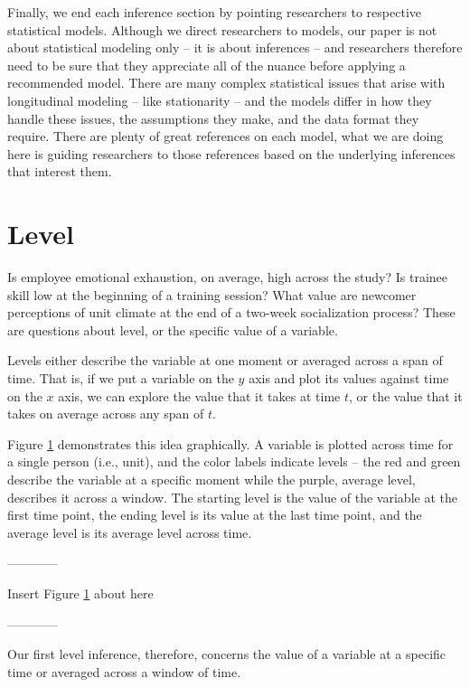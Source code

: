 \documentclass[english,,man]{apa6}
\theoremstyle{definition}
\theoremstyle{definition}
\theoremstyle{definition}
\theoremstyle{remark}
\begin{document}
Finally, we end each inference section by pointing researchers to
respective statistical models. Although we direct researchers to models,
our paper is not about statistical modeling only -- it is about
inferences -- and researchers therefore need to be sure that they
appreciate all of the nuance before applying a recommended model. There
are many complex statistical issues that arise with longitudinal
modeling -- like stationarity -- and the models differ in how they
handle these issues, the assumptions they make, and the data format they
require. There are plenty of great references on each model, what we are
doing here is guiding researchers to those references based on the
underlying inferences that interest them.

\hypertarget{level}{%
\section{Level}\label{level}}

Is employee emotional exhaustion, on average, high across the study? Is
trainee skill low at the beginning of a training session? What value are
newcomer perceptions of unit climate at the end of a two-week
socialization process? These are questions about level, or the specific
value of a variable.

Levels either describe the variable at one moment or averaged across a
span of time. That is, if we put a variable on the \(y\) axis and plot
its values against time on the \(x\) axis, we can explore the value that
it takes at time \(t\), or the value that it takes on average across any
span of \(t\).

Figure \ref{level} demonstrates this idea graphically. A variable is
plotted across time for a single person (i.e., unit), and the color
labels indicate levels -- the red and green describe the variable at a
specific moment while the purple, average level, describes it across a
window. The starting level is the value of the variable at the first
time point, the ending level is its value at the last time point, and
the average level is its average level across time.

\begin{center}

------------

Insert Figure \ref{level} about here

------------

\end{center}

\noindent Our first level inference, therefore, concerns the value of a
variable at a specific time or averaged across a window of time.
\end{document}
